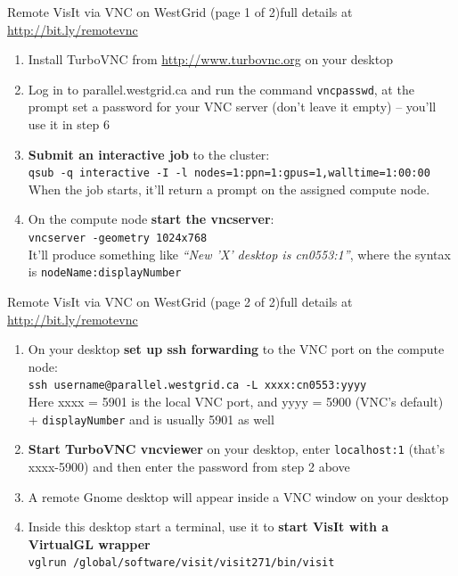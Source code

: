 \begin{frame}{Remote VisIt via VNC on WestGrid (page 1 of 2)}{full details at \url{http://bit.ly/remotevnc}}
  \begin{enumerate}\setlength{\itemsep}{2mm}
  \item Install TurboVNC from \url{http://www.turbovnc.org} on your desktop
  \item Log in to parallel.westgrid.ca and run the command \texttt{vncpasswd}, at the prompt set a
    password for your VNC server (don't leave it empty) -- you'll use it in step 6
  \item {\bf\color{red} Submit an interactive job} to the cluster:\\
    {\footnotesize\texttt{qsub -q interactive -I -l nodes=1:ppn=1:gpus=1,walltime=1:00:00}}\\
    When the job starts, it'll return a prompt on the assigned compute node.
  \item On the compute node {\bf\color{red} start the vncserver}:\\
    \texttt{vncserver -geometry 1024x768}\\
    It'll produce something like {\it ``New 'X' desktop is cn0553:1''}, where the syntax is
    \texttt{nodeName:displayNumber}
  \end{enumerate}
\end{frame}

\begin{frame}{Remote VisIt via VNC on WestGrid (page 2 of 2)}{full details at \url{http://bit.ly/remotevnc}}
  \begin{enumerate}\setlength{\itemsep}{2mm}
  \item On your desktop {\bf\color{red} set up ssh forwarding} to the VNC port on the compute node:\\
    \texttt{ssh username@parallel.westgrid.ca -L xxxx:cn0553:yyyy}\\
    Here xxxx = 5901 is the local VNC port, and yyyy = 5900 (VNC's default) + \texttt{displayNumber}
    and is usually 5901 as well
  \item {\bf\color{red} Start TurboVNC vncviewer} on your desktop, enter \texttt{localhost:1} (that's
    xxxx-5900) and then enter the password from step 2 above
  \item A remote Gnome desktop will appear inside a VNC window on your desktop
  \item Inside this desktop start a terminal, use it to {\bf\color{red} start VisIt with a VirtualGL
    wrapper}\\
    {\footnotesize\texttt{vglrun /global/software/visit/visit271/bin/visit}}
  \end{enumerate}
\end{frame}

